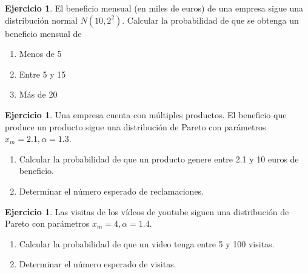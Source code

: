 \documentclass[]{article}
\theoremstyle{plain}
\theoremstyle{definition}
\newtheorem{exercise}[theorem]{Ejercicio}
\theoremstyle{definition} %
\begin{document}
\begin{exercise}
  El beneficio mensual (en miles de euros) de una empresa sigue una distribución normal  $N(10, 2^2)$. 
  Calcular la probabilidad de que se obtenga un beneficio mensual de
  \begin{enumerate}
    \item Menos de 5
    \item Entre 5 y 15
    \item Más de 20
  \end{enumerate}
\end{exercise}


\begin{exercise}
  Una empresa cuenta con múltiples productos. El beneficio que produce un producto sigue una distribución de Pareto 
  con parámetros $x_m = 2.1, \alpha = 1.3$. 
  \begin{enumerate}
    \item Calcular la probabilidad de que un producto genere entre 2.1 y 10 euros de beneficio.
    \item Determinar el número esperado de reclamaciones.
  \end{enumerate}
\end{exercise}

\begin{exercise}
  Las visitas de los vídeos de youtube siguen una distribución de Pareto 
  con parámetros $x_m = 4, \alpha = 1.4$. 
  \begin{enumerate}
    \item Calcular la probabilidad de que un video tenga entre 5 y 100 visitas.
    \item Determinar el número esperado de visitas.
  \end{enumerate}
\end{exercise}
\end{document}
